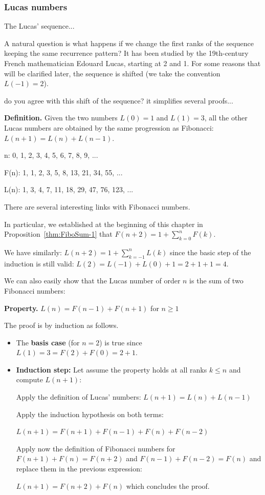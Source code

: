 \subsubsection{Lucas numbers}
\label{sec:Lucas-numbers}


The Lucas' sequence...

A natural question is what happens if we change the first ranks of the
sequence keeping the same recurrence pattern?  It has been studied by
the 19th-century French mathematician Edouard Lucas, starting at 2 and
1.  For some reasons that will be clarified
later, the sequence is shifted (we take the convention $L(-1)=2$).

{\Denis do you agree with this shift of the sequence? it simplifies several proofs...}
\bigskip

\noindent
{\bf Definition.}
Given the two numbers $L(0) = 1$ and $L(1) = 3$, 
all the other Lucas numbers are obtained by the same progression as Fibonacci: 
$L(n+1) = L(n)+L(n-1)$.
\bigskip

n: 0, 1, 2, 3, 4, 5, 6, 7, 8, 9, ...

F(n): 1, 1, 2, 3, 5, 8, 13, 21, 34, 55, ...

L(n): 1, 3, 4, 7, 11, 18, 29, 47, 76, 123, ...
\bigskip

There are several interesting links with Fibonacci numbers.

In particular, we established at the beginning of this chapter in
Proposition~\ref{thm:FiboSum-1} that $F(n+2) = 1+ \sum_{k=0}^{n}
F(k)$.

We have similarly: $L(n+2) = 1+ \sum_{k=-1}^{n} L(k)$ since the basic step of the induction is still valid: $L(2) = L(-1 )+L(0) +1 = 2+1+1 = 4$.
\bigskip

We can also easily show that the Lucas number of order $n$ is the sum of two Fibonacci numbers:

\noindent \textbf{Property. } 
\label{prop:Lucas1}
$L(n) = F(n-1)+F(n+1)$ for $n \geq 1$
\medskip


The proof is by induction as follows.

\begin{itemize}
\item
The \textbf{basis case} (for $n=2$) is true since $L(1) = 3 = F(2) + F(0) = 2+1$.

\item
\textbf{Induction step:} Let assume the property holds at all ranks $k \leq n$ and compute $L(n+1)$:

Apply the definition of Lucas' numbers: $L(n+1) = L(n)+L(n-1)$

Apply the induction hypothesis on both terms:

 $L(n+1) = F(n+1)+F(n-1)+F(n)+F(n-2)$
 
Apply now the definition of Fibonacci numbers for $F(n+1) + F(n) = F(n+2)$  and $F(n-1) + F(n-2) = F(n)$
and replace them in the previous expression:

$L(n+1) = F(n+2)+F(n)$
which concludes the proof.

%
\end{itemize}
\medskip

